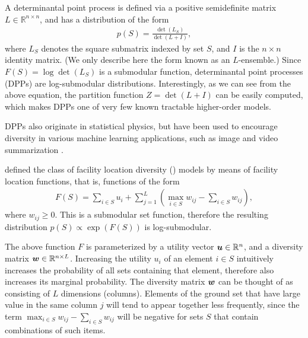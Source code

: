 \begin{example}
A determinantal point process \citep{lyons03,kulesza12} is defined via a positive semidefinite matrix $L \in \mathbb{R}^{n \times n}$, and has a distribution of the form
\begin{align*}
p(S) = \frac{\det(L_S)}{\det(L + I)},
\end{align*}
where $L_S$ denotes the square submatrix indexed by set $S$, and $I$ is the $n \times n$ identity matrix.
(We only describe here the form known as an $L$-ensemble.)
Since $F(S) = \log \det(L_S)$ is a submodular function, determinantal point processes (DPPs) are log-submodular distributions.
Interestingly, as we can see from the above equation, the partition function $Z = \det(L + I)$ can be easily computed, which makes DPPs one of very few known tractable higher-order models.

DPPs also originate in statistical physics, but have been used to encourage diversity in various machine learning applications, such as image and video summarization \citep{kulesza12,gong14}.
\end{example}

\begin{example}[\flid{}]
\cite{tschiatschek16} defined the class of facility location diversity (\flid) models by means of facility location functions, that is, functions of the form
\begin{align*}
F(S) = \sum_{i \in S} u_i + \sum_{j=1}^{L} \left(\max_{i \in S} w_{ij} - \sum_{i \in S} w_{ij}\right),
\end{align*}
where $w_{ij} \geq 0$.
This is a submodular set function, therefore the resulting distribution $p(S) \propto \exp(F(S))$ is log-submodular.

The above function $F$ is parameterized by a utility vector $\bm{u} \in \mathbb{R}^n$, and a diversity matrix $\bm{w} \in \mathbb{R}^{n\times L}$.
Increasing the utility $u_i$ of an element $i \in S$ intuitively increases the probability of all sets containing that element, therefore also increases its marginal probability.
The diversity matrix $\bm{w}$ can be thought of as consisting of $L$ dimensions (columns).
Elements of the ground set that have large value in the same column $j$ will tend to appear together less frequently, since the term $\max_{i \in S} w_{ij} - \sum_{i \in S} w_{ij}$ will be negative for sets $S$ that contain combinations of such items.

\end{example}

